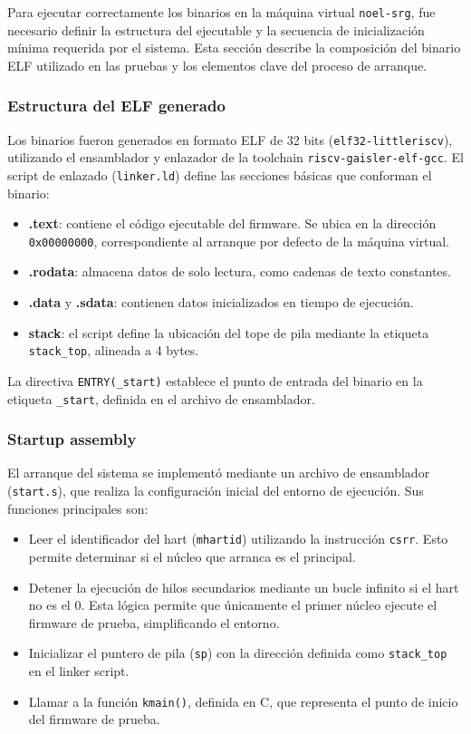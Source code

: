 Para ejecutar correctamente los binarios en la máquina virtual \texttt{noel-srg}, fue necesario definir la estructura del ejecutable y la secuencia de inicialización mínima requerida por el sistema. Esta sección describe la composición del binario ELF utilizado en las pruebas y los elementos clave del proceso de arranque.

\subsubsection*{Estructura del ELF generado}

Los binarios fueron generados en formato ELF de 32 bits (\texttt{elf32-littleriscv}), utilizando el ensamblador y enlazador de la toolchain \texttt{riscv-gaisler-elf-gcc}. El script de enlazado (\texttt{linker.ld}) define las secciones básicas que conforman el binario:

\begin{itemize}
    \item \textbf{.text}: contiene el código ejecutable del firmware. Se ubica en la dirección \texttt{0x00000000}, correspondiente al arranque por defecto de la máquina virtual.
    \item \textbf{.rodata}: almacena datos de solo lectura, como cadenas de texto constantes.
    \item \textbf{.data} y \textbf{.sdata}: contienen datos inicializados en tiempo de ejecución.
    \item \textbf{stack}: el script define la ubicación del tope de pila mediante la etiqueta \texttt{stack\_top}, alineada a 4 bytes.
\end{itemize}

La directiva \texttt{ENTRY(\_start)} establece el punto de entrada del binario en la etiqueta \texttt{\_start}, definida en el archivo de ensamblador.

\subsubsection*{Startup assembly}

El arranque del sistema se implementó mediante un archivo de ensamblador (\texttt{start.s}), que realiza la configuración inicial del entorno de ejecución. Sus funciones principales son:

\begin{itemize}
    \item Leer el identificador del hart (\texttt{mhartid}) utilizando la instrucción \texttt{csrr}. Esto permite determinar si el núcleo que arranca es el principal.
    \item Detener la ejecución de hilos secundarios mediante un bucle infinito si el hart no es el 0. Esta lógica permite que únicamente el primer núcleo ejecute el firmware de prueba, simplificando el entorno.
    \item Inicializar el puntero de pila (\texttt{sp}) con la dirección definida como \texttt{stack\_top} en el linker script.
    \item Llamar a la función \texttt{kmain()}, definida en C, que representa el punto de inicio del firmware de prueba.
\end{itemize}

